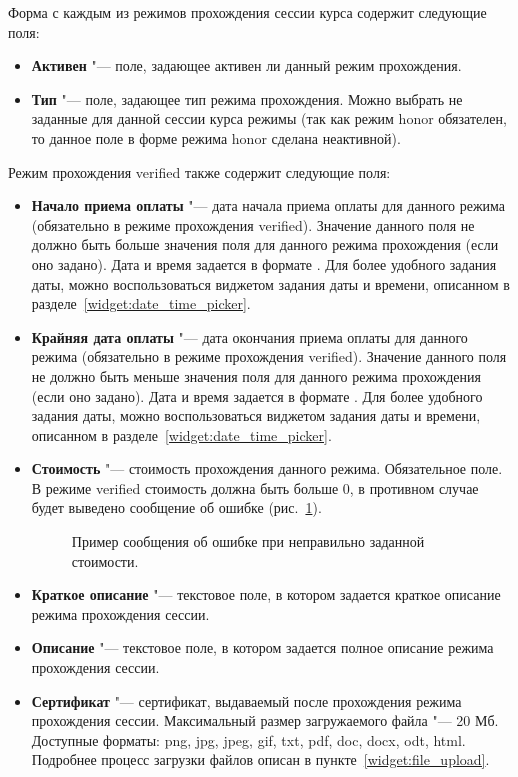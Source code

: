 	Форма с каждым из режимов прохождения сессии курса содержит следующие поля:
	\begin{itemize}
		\item \textbf{Активен} "--- поле, задающее активен ли данный режим прохождения.
		
		\item \textbf{Тип} "--- поле, задающее тип режима прохождения. Можно выбрать не заданные для данной сессии курса режимы (так как режим honor обязателен, то данное поле в форме режима honor сделана неактивной).
	\end{itemize}
	
	Режим прохождения verified также содержит следующие поля:	
	\begin{itemize}
		\item \textbf{Начало приема оплаты} "--- дата начала приема оплаты для данного режима (обязательно в режиме прохождения verified). Значение данного поля не должно быть больше значения поля  для данного режима прохождения (если оно задано). Дата и время задается в формате . Для более удобного задания даты, можно воспользоваться виджетом задания даты и времени, описанном в разделе~\ref{widget:date_time_picker}.
		
		\item \textbf{Крайняя дата оплаты} "--- дата окончания приема оплаты для данного режима (обязательно в режиме прохождения verified). Значение данного поля не должно быть меньше значения поля  для данного режима прохождения (если оно задано). Дата и время задается в формате . Для более удобного задания даты, можно воспользоваться виджетом задания даты и времени, описанном в разделе~\ref{widget:date_time_picker}.
		
		\item \textbf{Стоимость} "--- стоимость прохождения данного режима. Обязательное поле. В режиме verified стоимость должна быть больше 0, в противном случае будет выведено сообщение об ошибке (рис.~\ref{img:course_session:course_session_mode_cost_error}).
		\begin{figure}[H]
			\caption{Пример сообщения об ошибке при неправильно заданной стоимости.}
			\label{img:course_session:course_session_mode_cost_error}
		\end{figure}
		
		\item \textbf{Краткое описание} "--- текстовое поле, в котором задается краткое описание режима прохождения сессии.
		
		\item \textbf{Описание} "--- текстовое поле, в котором задается полное описание режима прохождения сессии.
		
		\item \textbf{Сертификат} "--- сертификат, выдаваемый после прохождения режима прохождения сессии. Максимальный размер загружаемого файла "--- 20 Мб. Доступные форматы: png, jpg, jpeg, gif, txt, pdf, doc, docx, odt, html. Подробнее процесс загрузки файлов описан в пункте~\ref{widget:file_upload}.
	\end{itemize}
	
